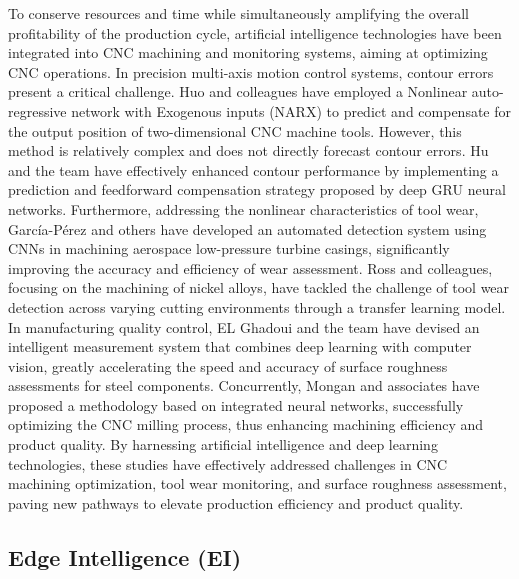 \documentclass[preprint,12pt,authoryear]{elsarticle}
\begin{document}
To conserve resources and time while simultaneously amplifying the overall profitability of the production cycle, artificial intelligence technologies have been integrated into CNC machining and monitoring systems, aiming at optimizing CNC operations. In precision multi-axis motion control systems, contour errors present a critical challenge. Huo and colleagues have employed a Nonlinear auto-regressive network with Exogenous inputs (NARX) to predict and compensate for the output position of two-dimensional CNC machine tools. However, this method is relatively complex and does not directly forecast contour errors. Hu and the team have effectively enhanced contour performance by implementing a prediction and feedforward compensation strategy proposed by deep GRU neural networks. Furthermore, addressing the nonlinear characteristics of tool wear, García-Pérez and others have developed an automated detection system using CNNs in machining aerospace low-pressure turbine casings, significantly improving the accuracy and efficiency of wear assessment. Ross and colleagues, focusing on the machining of nickel alloys, have tackled the challenge of tool wear detection across varying cutting environments through a transfer learning model. In manufacturing quality control, EL Ghadoui and the team have devised an intelligent measurement system that combines deep learning with computer vision, greatly accelerating the speed and accuracy of surface roughness assessments for steel components. Concurrently, Mongan and associates have proposed a methodology based on integrated neural networks, successfully optimizing the CNC milling process, thus enhancing machining efficiency and product quality. By harnessing artificial intelligence and deep learning technologies, these studies have effectively addressed challenges in CNC machining optimization, tool wear monitoring, and surface roughness assessment, paving new pathways to elevate production efficiency and product quality.

\subsection{Edge Intelligence (EI)}
\end{document}
